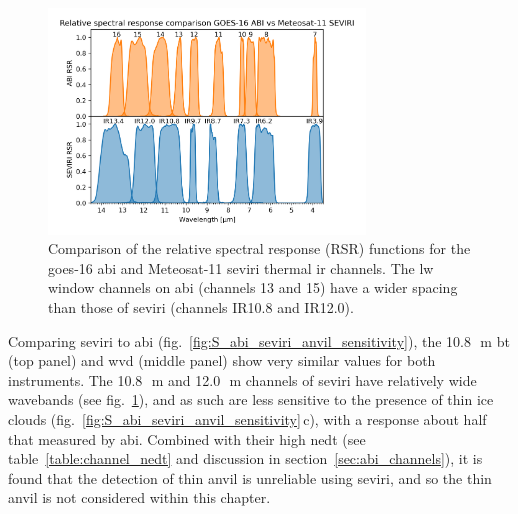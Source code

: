 \begin{figure}[tp]
    \centering
    \includegraphics[width=0.75\textwidth]{figures/chapter4_05.png}
    \caption[
    Comparison of the relative spectral response (RSR) functions for the \acrshort{goes}-16 \acrshort{abi} and Meteosat-11 \acrshort{seviri} thermal \acrshort{ir} channels
    ]{
    Comparison of the relative spectral response (RSR) functions for the \acrshort{goes}-16 \acrshort{abi} and Meteosat-11 \acrshort{seviri} thermal \acrshort{ir} channels. The \acrshort{lw} window channels on \acrshort{abi} (channels 13 and 15) have a wider spacing than those of \acrshort{seviri} (channels IR10.8 and IR12.0).}
    \label{fig:S_abi_seviri_rsr}
\end{figure}


Comparing \acrshort{seviri} to \acrshort{abi} (fig.~\ref{fig:S_abi_seviri_anvil_sensitivity}), the 10.8\,\unit{\mu m} \acrshort{bt} (top panel) and \acrshort{wvd} (middle panel) show very similar values for both instruments.
The 10.8\,\unit{\mu m} and 12.0\,\unit{\mu m} channels of \acrshort{seviri} have relatively wide wavebands (see fig.~\ref{fig:S_abi_seviri_rsr}), and as such are less sensitive to the presence of thin ice clouds (fig.~\ref{fig:S_abi_seviri_anvil_sensitivity}\,c), with a response about half that measured by \acrshort{abi}.
Combined with their high \acrshort{nedt} (see table~\ref{table:channel_nedt} and discussion in section~\ref{sec:abi_channels}), it is found that the detection of thin anvil is unreliable using \acrshort{seviri}, and so the thin anvil is not considered within this chapter.



